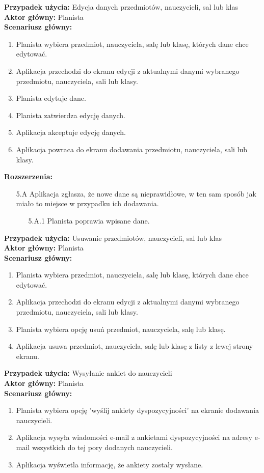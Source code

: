 \noindent
\textbf{Przypadek użycia:} Edycja danych przedmiotów, nauczycieli, sal lub klas\\
\textbf{Aktor główny:} Planista\\
\textbf{Scenariusz główny:}
\begin{enumerate}
	\item Planista wybiera przedmiot, nauczyciela, salę lub klasę, których dane chce edytować.
	\item Aplikacja przechodzi do ekranu edycji z aktualnymi danymi wybranego przedmiotu, nauczyciela, sali lub klasy.
	\item Planista edytuje dane.
	\item Planista zatwierdza edycję danych.
	\item Aplikacja akceptuje edycję danych.
	\item Aplikacja powraca do ekranu dodawania przedmiotu, nauczyciela, sali lub klasy.
\end{enumerate}
\textbf{Rozszerzenia:}
	\begin{enumerate}
         \item[5.A] Aplikacja zgłasza, że nowe dane są nieprawidłowe, w ten sam sposób jak miało to miejsce w przypadku ich dodawania.
         \begin{enumerate}
         	\item[5.A.1] Planista poprawia wpisane dane.
         \end{enumerate}
	\end{enumerate}
	
\noindent
\textbf{Przypadek użycia:} Usuwanie przedmiotów, nauczycieli, sal lub klas\\
\textbf{Aktor główny:} Planista\\
\textbf{Scenariusz główny:}
\begin{enumerate}
	\item Planista wybiera przedmiot, nauczyciela, salę lub klasę, których dane chce edytować.
	\item Aplikacja przechodzi do ekranu edycji z aktualnymi danymi wybranego przedmiotu, nauczyciela, sali lub klasy.
	\item Planista wybiera opcję usuń przedmiot, nauczyciela, salę lub klasę.
	\item Aplikacja usuwa przedmiot, nauczyciela, salę lub klasę z listy z lewej strony ekranu.
\end{enumerate}

\noindent
\textbf{Przypadek użycia:} Wysyłanie ankiet do nauczycieli\\
\textbf{Aktor główny:} Planista\\
\textbf{Scenariusz główny:}
\begin{enumerate}
	\item Planista wybiera opcję 'wyślij ankiety dyspozycyjności' na ekranie dodawania nauczycieli.
	\item Aplikacja wysyła wiadomości e-mail z ankietami dyspozycyjności na adresy e-mail wszystkich do tej pory dodanych nauczycieli.
	\item Aplikacja wyświetla informację, że ankiety zostały wysłane.
\end{enumerate}

